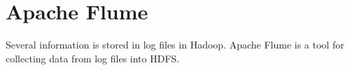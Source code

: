 \chapter{Apache Flume}
\label{chap:Flume}

Several information is stored in log files in Hadoop.
Apache Flume is a tool for collecting data from log files into HDFS. 
